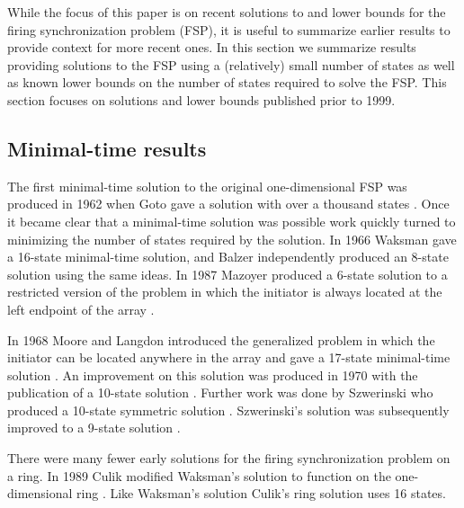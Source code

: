 \documentclass{article}
\begin{document}
While the focus of this paper is on recent solutions to and lower bounds for the firing synchronization problem (FSP), it is useful to summarize earlier results to provide context for more recent ones. In this section we summarize results providing solutions to the FSP using a (relatively) small number of states as well as known lower bounds on the number of states required to solve the FSP. This section focuses on solutions and lower bounds published prior to 1999.

\subsection{Minimal-time results}

The first minimal-time solution to the original one-dimensional FSP was produced in 1962 when Goto gave a solution with over a thousand states \cite{Goto1962}. Once it became clear that a minimal-time solution was possible work quickly turned to minimizing the number of states required by the solution. In 1966 Waksman \cite{waksman1966optimum} gave a 16-state minimal-time solution, and Balzer \cite{Balzer1967} independently produced an 8-state solution using the same ideas. In 1987 Mazoyer produced a 6-state solution to a restricted version of the problem in which the initiator is always located at the left endpoint of the array \cite{Mazoyer1987}.

In 1968 Moore and Langdon introduced the generalized problem in which the initiator can be located anywhere in the array and gave a 17-state minimal-time solution \cite{MooreLangdon1968}. An improvement on this solution was produced in 1970 with the publication of a 10-state solution \cite{VMP1970}. Further work was done by Szwerinski who produced a 10-state symmetric solution \cite{szwerinski1982time}. Szwerinski's solution was subsequently improved to a 9-state solution \cite{settle1999new}.

There were many fewer early solutions for the firing synchronization problem on a ring. In 1989 Culik modified Waksman's solution to function on the one-dimensional ring \cite{Culik1989}. Like Waksman's solution Culik's ring solution uses 16 states.
\end{document}
